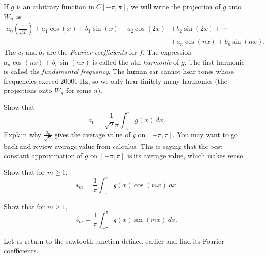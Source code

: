 \begin{pactivity} \label{act:Fourier_projection} If $g$ is an arbitrary function in $C[-\pi,\pi]$, we will write the projection of $g$ onto $W_n$ as
\begin{align*}
a_0\left(\frac{1}{\sqrt{2}}\right) + a_1 \cos(x) + b_1\sin(x) + a_2 \cos(2x) &+ b_2 \sin(2x) + \cdots \\
	&+ a_n \cos(nx) + b_n \sin(nx).
\end{align*}
The $a_i$ and $b_j$ are the \emph{Fourier coefficients} for $f$. The expression $a_n\cos(nx)+b_n\sin(nx)$ is called the $n$th \emph{harmonic} of $g$. The first harmonic is called the \emph{fundamental frequency}. The human ear cannot hear tones whose frequencies exceed 20000 Hz, so we only hear finitely many harmonics (the projections onto $W_n$ for some $n$).
	\ba
	\item Show that
\begin{equation}
a_0 =  \frac{1}{\sqrt{2}\pi}\int_{-\pi}^{\pi} g(x) \ dx. \label{eq:a0}
\end{equation}
Explain why $\frac{a_0}{\sqrt{2}}$ gives the average value of $g$ on $[-\pi,\pi]$. You may want to go back and review average value from calculus. This is saying that the best constant approximation of $g$ on $[-\pi,\pi]$ is its average value, which makes sense.

	
	\item Show that for $m \geq 1$,
\begin{equation}
a_m =  \frac{1}{\pi}\int_{-\pi}^{\pi} g(x) \cos(mx) \ dx. \label{eq:am}
\end{equation}


	\item Show that for $m \geq 1$,
\begin{equation}
b_m =  \frac{1}{\pi}\int_{-\pi}^{\pi} g(x) \sin(mx) \ dx. \label{eq:bm}
\end{equation}


	\ea
\end{pactivity}

Let us return to the sawtooth function defined earlier and find its Fourier coefficients.

